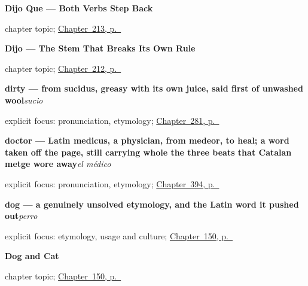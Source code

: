 \noindent\begin{minipage}[t]{\linewidth}
\raggedright
\textbf{Dijo Que --- Both Verbs Step Back}\par
\footnotesize chapter topic; \hyperref[ch:dijo-que]{Chapter~213, p.~\pageref*{ch:dijo-que}}
\end{minipage}\par\smallskip

\noindent\begin{minipage}[t]{\linewidth}
\raggedright
\textbf{Dijo --- The Stem That Breaks Its Own Rule}\par
\footnotesize chapter topic; \hyperref[ch:dijo]{Chapter~212, p.~\pageref*{ch:dijo}}
\end{minipage}\par\smallskip

\noindent\begin{minipage}[t]{\linewidth}
\raggedright
\textbf{dirty — from sucidus, greasy with its own juice, said first of unwashed wool}\enspace\emph{sucio}\par
\footnotesize explicit focus: pronunciation, etymology; \hyperref[ch:cuatro-adjetivos]{Chapter~281, p.~\pageref*{ch:cuatro-adjetivos}}
\end{minipage}\par\smallskip

\noindent\begin{minipage}[t]{\linewidth}
\raggedright
\textbf{doctor — Latin medicus, a physician, from medeor, to heal; a word taken off the page, still carrying whole the three beats that Catalan metge wore away}\enspace\emph{el médico}\par
\footnotesize explicit focus: pronunciation, etymology; \hyperref[ch:la-universidad-y-el-trabajo]{Chapter~394, p.~\pageref*{ch:la-universidad-y-el-trabajo}}
\end{minipage}\par\smallskip

\noindent\begin{minipage}[t]{\linewidth}
\raggedright
\textbf{dog — a genuinely unsolved etymology, and the Latin word it pushed out}\enspace\emph{perro}\par
\footnotesize explicit focus: etymology, usage and culture; \hyperref[ch:spanish-dog-and-cat]{Chapter~150, p.~\pageref*{ch:spanish-dog-and-cat}}
\end{minipage}\par\smallskip

\noindent\begin{minipage}[t]{\linewidth}
\raggedright
\textbf{Dog and Cat}\par
\footnotesize chapter topic; \hyperref[ch:spanish-dog-and-cat]{Chapter~150, p.~\pageref*{ch:spanish-dog-and-cat}}
\end{minipage}\par\smallskip

